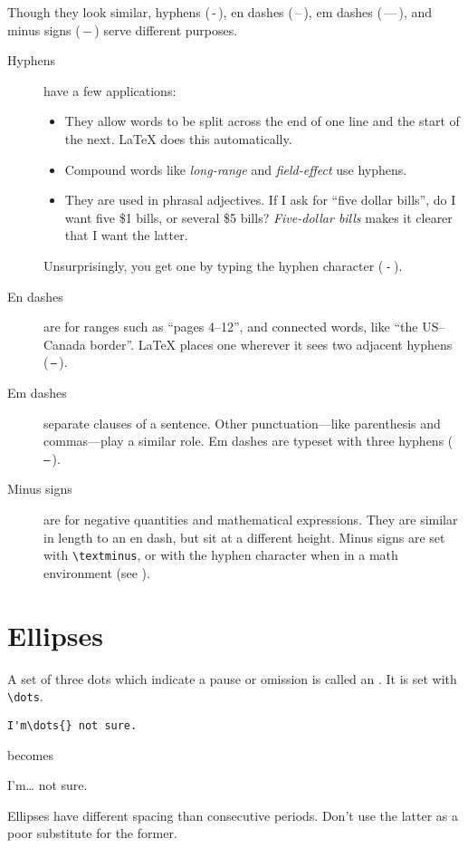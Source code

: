 Though they look similar,
hyphens (\,-\,), en dashes (\,--\,),
em dashes (\,---\,), and minus signs (\,$-$\,)
serve different purposes.
\begin{description}
\item[Hyphens] have a few applications:
    \begin{itemize}[leftmargin=*]
    \item They allow words to be split across the end of one line and the
        start of the next.
        \LaTeX{} does this automatically.
    \item Compound words like \emph{long-range} and \emph{field-effect}
        use hyphens.
    \item They are used in phrasal adjectives.
        If I ask for ``five dollar bills''\quotekern,
        do I want five \$1 bills, or several \$5 bills?
        \emph{Five-dollar bills} makes it clearer that I want the latter.
    \end{itemize}
    Unsurprisingly, you get one by typing the hyphen character (\,\texttt{-}\,).

\item[En dashes] are for ranges such as ``pages 4--12''\quotekern,
    and connected words, like ``the \mbox{US--Canada} border''\quotekern.
    \LaTeX{} places one wherever it sees two adjacent hyphens
    (\,\texttt{--}\,).

\item[Em dashes] separate clauses of a sentence.
    Other punctuation---like parenthesis and commas---play a similar
    role.
    Em dashes are typeset with three hyphens (\,\texttt{---}\,).

\item[Minus signs] are for negative quantities and
    mathematical expressions.
    They are similar in length to an en dash,
    but sit at a different height.
    Minus signs are set with \verb|\textminus|,
    or with the hyphen character
    when in a math environment (see ).
\end{description}

\section{Ellipses}

A set of three dots which indicate a pause or omission is called an
.
It is set with \verb|\dots|.
\begin{leftfigure}
\begin{lstlisting}
I'm\dots{} not sure.
\end{lstlisting}
\end{leftfigure}
becomes
\begin{leftfigure}
\lm%
I'm\dots{} not sure.
\end{leftfigure}
Ellipses have different spacing than consecutive periods.
Don't use the latter as a poor substitute for the former.

